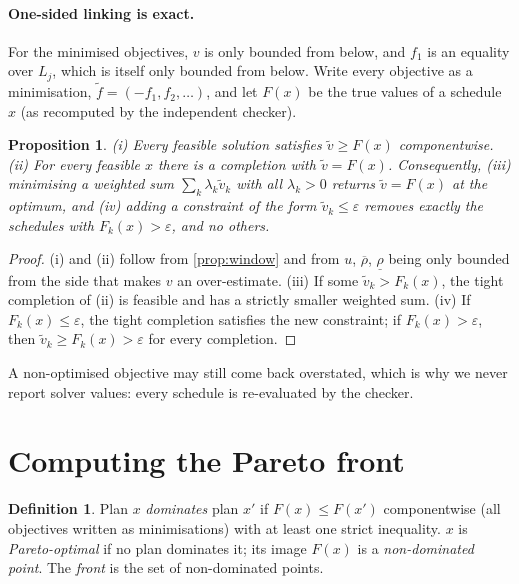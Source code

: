 \documentclass[10pt,a4paper]{article}
\theoremstyle{plain}
\newtheorem{proposition}{Proposition}
\theoremstyle{definition}
\newtheorem{definition}{Definition}
\theoremstyle{remark}
\begin{document}
\paragraph{One-sided linking is exact.} For the minimised objectives, $v$ is only bounded from
below, and $f_1$ is an equality over $L_j$, which is itself only bounded from below. Write every
objective as a minimisation, $\tilde f=(-f_1,f_2,\dots)$, and let $F(x)$ be the true values of a
schedule $x$ (as recomputed by the independent checker).

\begin{proposition}\label{prop:onesided}
(i) Every feasible solution satisfies $\tilde v\ge F(x)$ componentwise. (ii) For every feasible $x$
there is a completion with $\tilde v=F(x)$. Consequently, (iii) minimising a weighted sum
$\sum_k\lambda_k\tilde v_k$ with all $\lambda_k>0$ returns $\tilde v=F(x)$ at the optimum, and (iv)
adding a constraint of the form $\tilde v_k\le\varepsilon$ removes exactly the schedules with
$F_k(x)>\varepsilon$, and no others.
\end{proposition}
\begin{proof}
(i) and (ii) follow from \cref{prop:window} and from $u$, $\overline\rho$, $\underline\rho$ being
only bounded from the side that makes $v$ an over-estimate. (iii) If some $\tilde v_k>F_k(x)$, the
tight completion of (ii) is feasible and has a strictly smaller weighted sum. (iv) If
$F_k(x)\le\varepsilon$, the tight completion satisfies the new constraint; if $F_k(x)>\varepsilon$,
then $\tilde v_k\ge F_k(x)>\varepsilon$ for every completion.
\end{proof}

A non-optimised objective may still come back overstated, which is why we never report solver values:
every schedule is re-evaluated by the checker.

\section{Computing the Pareto front}

\begin{definition}
Plan $x$ \emph{dominates} plan $x'$ if $F(x)\le F(x')$ componentwise (all objectives written as
minimisations) with at least one strict inequality. $x$ is \emph{Pareto-optimal} if no plan dominates
it; its image $F(x)$ is a \emph{non-dominated point}. The \emph{front} is the set of non-dominated
points.
\end{definition}
\end{document}
